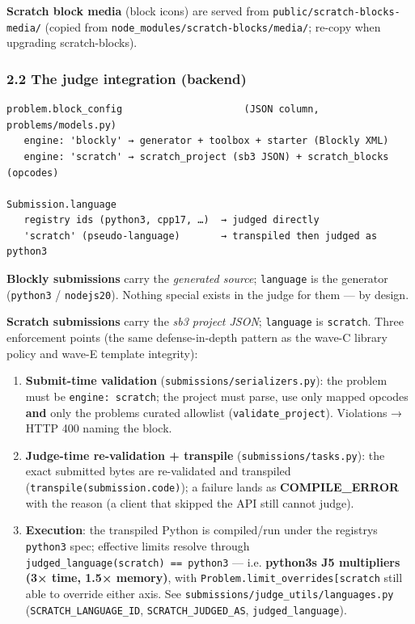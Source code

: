 \documentclass[
]{article}
\providecommand{\tightlist}{%
  \setlength{\itemsep}{0pt}\setlength{\parskip}{0pt}}
\begin{document}
\textbf{Scratch block media} (block icons) are served from
\texttt{public/scratch-blocks-media/} (copied from
\texttt{node\_modules/scratch-blocks/media/}; re-copy when upgrading
scratch-blocks).

\subsubsection{2.2 The judge integration
(backend)}\label{22-the-judge-integration-backend}

\begin{verbatim}
problem.block_config                     (JSON column, problems/models.py)
   engine: 'blockly' → generator + toolbox + starter (Blockly XML)
   engine: 'scratch' → scratch_project (sb3 JSON) + scratch_blocks (opcodes)

Submission.language
   registry ids (python3, cpp17, …)  → judged directly
   'scratch' (pseudo-language)       → transpiled then judged as python3
\end{verbatim}

\textbf{Blockly submissions} carry the \emph{generated source};
\texttt{language} is the generator (\texttt{python3} /
\texttt{nodejs20}). Nothing special exists in the judge for them --- by
design.

\textbf{Scratch submissions} carry the \emph{sb3 project JSON};
\texttt{language} is \texttt{scratch}. Three enforcement points (the
same defense-in-depth pattern as the wave-C library policy and wave-E
template integrity):

\begin{enumerate}
\def\labelenumi{\arabic{enumi}.}
\tightlist
\item
  \textbf{Submit-time validation} (\texttt{submissions/serializers.py}):
  the problem must be
  \texttt{engine:\ \textquotesingle{}scratch\textquotesingle{}}; the
  project must parse, use only mapped opcodes \textbf{and} only the
  problem\textquotesingle s curated allowlist
  (\texttt{validate\_project}). Violations → HTTP 400 naming the block.
\item
  \textbf{Judge-time re-validation + transpile}
  (\texttt{submissions/tasks.py}): the exact submitted bytes are
  re-validated and transpiled (\texttt{transpile(submission.code)}); a
  failure lands as \textbf{COMPILE\_ERROR} with the reason (a client
  that skipped the API still cannot judge).
\item
  \textbf{Execution}: the transpiled Python is compiled/run under the
  registry\textquotesingle s \texttt{python3} spec; effective limits
  resolve through
  \texttt{judged\_language(\textquotesingle{}scratch\textquotesingle{})\ ==\ \textquotesingle{}python3\textquotesingle{}}
  --- i.e. \textbf{python3\textquotesingle s J5 multipliers (3× time,
  1.5× memory)}, with
  \texttt{Problem.limit\_overrides{[}\textquotesingle{}scratch\textquotesingle{}{]}}
  still able to override either axis. See
  \texttt{submissions/judge\_utils/languages.py}
  (\texttt{SCRATCH\_LANGUAGE\_ID}, \texttt{SCRATCH\_JUDGED\_AS},
  \texttt{judged\_language}).
\end{enumerate}
\end{document}
